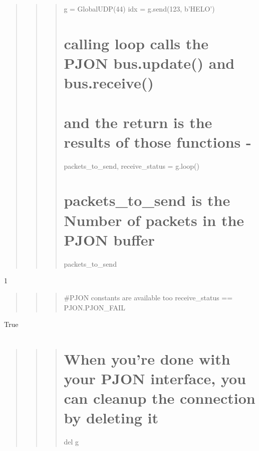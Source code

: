 \begin{quotation}
\begin{quotation}
\begin{quotation}
g = Global\-U\-D\-P(44) idx = g.\-send(123, b'H\-E\-L\-O') \section*{calling loop calls the P\-J\-O\-N bus.\-update() and bus.\-receive()}

\section*{and the return is the results of those functions -\/}

packets\-\_\-to\-\_\-send, receive\-\_\-status = g.\-loop() \section*{packets\-\_\-to\-\_\-send is the Number of packets in the P\-J\-O\-N buffer}

packets\-\_\-to\-\_\-send

\end{quotation}


\end{quotation}


\end{quotation}
1 \begin{quotation}
\begin{quotation}
\begin{quotation}
\#\-P\-J\-O\-N constants are available too receive\-\_\-status == P\-J\-O\-N.\-P\-J\-O\-N\-\_\-\-F\-A\-I\-L

\end{quotation}


\end{quotation}


\end{quotation}
True \begin{quotation}
\begin{quotation}
\begin{quotation}
\section*{When you're done with your P\-J\-O\-N interface, you can cleanup the connection by deleting it}

del g

\end{quotation}


\end{quotation}


\end{quotation}


